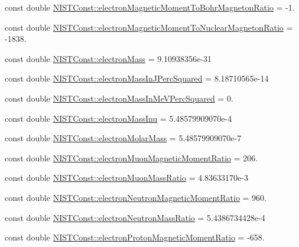 \begin{DoxyCompactItemize}
\item 
const double \hyperlink{group___n_i_s_t_const-_electron_ga921889f482e157189bf19818e428532f}{N\+I\+S\+T\+Const\+::electron\+Magnetic\+Moment\+To\+Bohr\+Magneton\+Ratio} = -\/1.
\item 
const double \hyperlink{group___n_i_s_t_const-_electron_ga2c0f984bb3ae4dd8ca2696d4fec8f9bf}{N\+I\+S\+T\+Const\+::electron\+Magnetic\+Moment\+To\+Nuclear\+Magneton\+Ratio} = -\/1838.
\item 
const double \hyperlink{group___n_i_s_t_const-_electron_ga2c9773ce81cfbe85e9042adccd788589}{N\+I\+S\+T\+Const\+::electron\+Mass} = 9.\+10938356e-\/31
\item 
const double \hyperlink{group___n_i_s_t_const-_electron_gad128828903af19e91fdc1a95ef9cbb24}{N\+I\+S\+T\+Const\+::electron\+Mass\+In\+J\+Perc\+Squared} = 8.\+18710565e-\/14
\item 
const double \hyperlink{group___n_i_s_t_const-_electron_ga6a41b7cbd78c00ef17e9b17944ab5f5c}{N\+I\+S\+T\+Const\+::electron\+Mass\+In\+Me\+V\+Perc\+Squared} = 0.
\item 
const double \hyperlink{group___n_i_s_t_const-_electron_gaa6fc2ab3a81cd61f6d78d64eec8a670d}{N\+I\+S\+T\+Const\+::electron\+Mass\+Inu} = 5.\+48579909070e-\/4
\item 
const double \hyperlink{group___n_i_s_t_const-_electron_gaebecd54c70326d72d25d790c0ab62145}{N\+I\+S\+T\+Const\+::electron\+Molar\+Mass} = 5.\+48579909070e-\/7
\item 
const double \hyperlink{group___n_i_s_t_const-_electron_gacd4a3b462095f6b3ec3de099a34b9726}{N\+I\+S\+T\+Const\+::electron\+Muon\+Magnetic\+Moment\+Ratio} = 206.
\item 
const double \hyperlink{group___n_i_s_t_const-_electron_ga6b6bb303de5ee3bd95d18e8024880eea}{N\+I\+S\+T\+Const\+::electron\+Muon\+Mass\+Ratio} = 4.\+83633170e-\/3
\item 
const double \hyperlink{group___n_i_s_t_const-_electron_ga556c66115bf01b011616c5675e8b33c1}{N\+I\+S\+T\+Const\+::electron\+Neutron\+Magnetic\+Moment\+Ratio} = 960.
\item 
const double \hyperlink{group___n_i_s_t_const-_electron_gad051ac865a63e667306850054f912ab1}{N\+I\+S\+T\+Const\+::electron\+Neutron\+Mass\+Ratio} = 5.\+4386734428e-\/4
\item 
const double \hyperlink{group___n_i_s_t_const-_electron_ga8ea70b9b79c3f8b4f9825c48d1758f44}{N\+I\+S\+T\+Const\+::electron\+Proton\+Magnetic\+Moment\+Ratio} = -\/658.

\end{DoxyCompactItemize}
